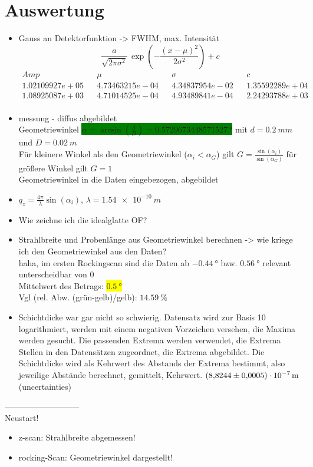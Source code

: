 \section{Auswertung}
\begin{itemize}
	\item Gauss an Detektorfunktion -> FWHM, max. Intensität
	\begin{equation*}
		\frac{a}{\sqrt{2 \pi \sigma^2}} \, \exp{\left(-\frac{\left(x-\mu \right)^2}{2 \sigma^2}\right)}+c
	\end{equation*}
	\begin{align}
		Amp && \mu && \sigma && c \\
		1.02109927e+05 && 4.73463215e-04 && 4.34837954e-02 && 1.35592289e+04 \\
		1.08925087e+03 && 4.71014525e-04 && 4.93489841e-04 && 2.24293788e+03 \\
	\end{align}
	\item messung - diffus abgebildet\\
	Geometriewinkel \colorbox{green}{$\alpha = \arcsin{\left( \frac{d}{D}\right)} = \SI{0.5729673448571527}{°}$} mit $d=\SI{0.2}{mm}$ und $D=\SI{0.02}{m}$\\
	Für kleinere Winkel als den Geometriewinkel ($\alpha_i < \alpha_G$) gilt $G = \frac{\sin{(\alpha_i)}}{\sin{(\alpha_G)}}$ für größere Winkel gilt $G=1$\\
	Geometriewinkel in die Daten eingebezogen, abgebildet
	\item $q_z=\frac{4\pi}{\lambda}\sin{(\alpha_i)}$, $\lambda = \SI{1.54e-10}{m}$
	\item Wie zeichne ich die idealglatte OF?
	\item Strahlbreite und Probenlänge aus Geometriewinkel berechnen -> wie kriege ich den Geometriewinkel aus den Daten?\\
	haha, im ersten Rockingscan sind die Daten ab $\SI{-0.44}{°}$ bzw. $\SI{0.56}{°}$ relevant unterscheidbar von 0\\
	Mittelwert des Betrags: \colorbox{yellow}{$\SI{0.5}{°}$} \\
	Vgl (rel. Abw. (grün-gelb)/gelb): $\SI{14.59}{\%}$
	\item Schichtdicke war gar nicht so schwierig. Datensatz wird zur Basis 10 logarithmiert, werden mit einem negativen Vorzeichen versehen, die Maxima werden gesucht.
	Die passenden Extrema werden verwendet, die Extrema Stellen in den Datensätzen zugeordnet, die Extrema abgebildet.
	Die Schichtdicke wird als Kehrwert des Abstands der Extrema bestimmt, also jeweilige Abstände berechnet, gemittelt, Kehrwert.
	$\SI{8.8244 \pm 0.0005 e-07}{m}$ (uncertainties)
\end{itemize}

---------------------------\\
Neustart!

\begin{itemize}
	\item z-scan: Strahlbreite abgemessen!
	\item rocking-Scan: Geometriewinkel dargestellt!
	
\end{itemize}
